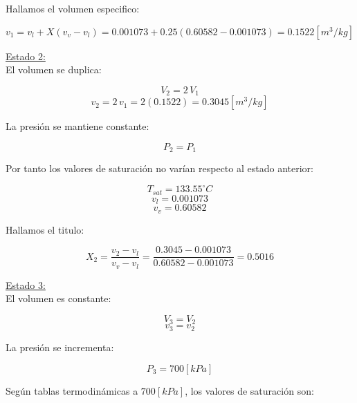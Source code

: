 \documentclass[letter,11pt]{article}
\begin{document}
\begin{enumerate}
Hallamos el volumen especifico:

\begin{equation*}
    v_1 = v_l + X(v_v-v_l)= 0.001073+0.25(0.60582-0.001073)=0.1522[m^3/kg]
\end{equation*}

\underline{Estado 2:} \\

El volumen se duplica:

\begin{equation*}
    V_2=2\,V_1
\end{equation*}
\begin{equation*}
    v_2=2\,v_1=2(0.1522)=0.3045[m^3/kg]
\end{equation*}

La presión se mantiene constante:

\begin{equation*}
    P_2=P_1
\end{equation*}

Por tanto los valores de saturación no varían respecto al estado anterior:

\begin{equation*}
    T_{sat}=133.55^\circ C
\end{equation*}
\begin{equation*}
    v_l=0.001073
\end{equation*}
\begin{equation*}
    v_v=0.60582
\end{equation*}

Hallamos el titulo:

\begin{equation*}
    X_2=\frac{v_2-v_l}{v_v-v_l}=\frac{0.3045-0.001073}{0.60582-0.001073}=0.5016
\end{equation*}

\underline{Estado 3:} \\

El volumen es constante:

\begin{equation*}
    V_3=V_2
\end{equation*}
\begin{equation*}
    v_3=v_2
\end{equation*}

La presión se incrementa:

\begin{equation*}
    P_3=700[kPa]
\end{equation*}

Según tablas termodinámicas a $700[kPa]$, los valores de saturación son:


\end{enumerate}
\end{document}
